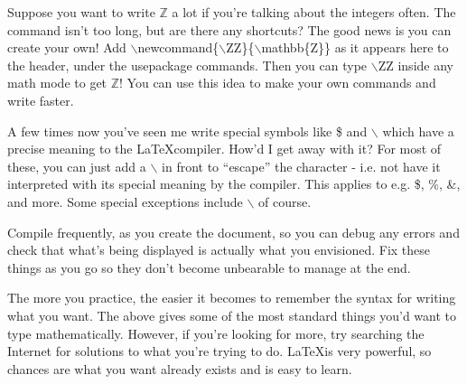\documentclass[12pt]{article}
\begin{document}
	Suppose you want to write $\mathbb{Z}$ a lot if you're talking about the integers often. The command isn't too long, but are there any shortcuts? The good news is you can create your own! Add $\backslash$newcommand\{$\backslash$ZZ\}\{$\backslash$mathbb\{Z\}\} as it appears here to the header, under the usepackage commands. Then you can type $\backslash$ZZ inside any math mode to get $\mathbb{Z}$! You can use this idea to make your own commands and write faster.
	
	\bigskip
	
	A few times now you've seen me write special symbols like \$ and $\backslash$ which have a precise meaning to the \LaTeX compiler. How'd I get away with it? For most of these, you can just add a $\backslash$ in front to ``escape'' the character - i.e. not have it interpreted with its special meaning by the compiler. This applies to e.g. \$, \%, \&, and more. Some special exceptions include $\backslash$ of course.
	
	\bigskip
	
	Compile frequently, as you create the document, so you can debug any errors and check that what's being displayed is actually what you envisioned. Fix these things as you go so they don't become unbearable to manage at the end.
	
	\bigskip
	
	The more you practice, the easier it becomes to remember the syntax for writing what you want. The above gives some of the most standard things you'd want to type mathematically. However, if you're looking for more, try searching the Internet for solutions to what you're trying to do. \LaTeX is very powerful, so chances are what you want already exists and is easy to learn.
	
	
	
	
\end{document}

